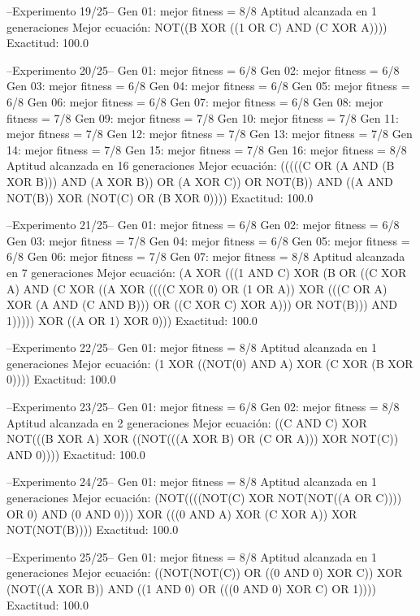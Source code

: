 --Experimento 
 19/25--
Gen 01: mejor fitness = 8/8
Aptitud alcanzada en 1 generaciones
Mejor ecuación: NOT((B XOR ((1 OR C) AND (C XOR A))))
 Exactitud: 100.0%

--Experimento 
 20/25--
Gen 01: mejor fitness = 6/8
Gen 02: mejor fitness = 6/8
Gen 03: mejor fitness = 6/8
Gen 04: mejor fitness = 6/8
Gen 05: mejor fitness = 6/8
Gen 06: mejor fitness = 6/8
Gen 07: mejor fitness = 6/8
Gen 08: mejor fitness = 7/8
Gen 09: mejor fitness = 7/8
Gen 10: mejor fitness = 7/8
Gen 11: mejor fitness = 7/8
Gen 12: mejor fitness = 7/8
Gen 13: mejor fitness = 7/8
Gen 14: mejor fitness = 7/8
Gen 15: mejor fitness = 7/8
Gen 16: mejor fitness = 8/8
Aptitud alcanzada en 16 generaciones
Mejor ecuación: (((((C OR (A AND (B XOR B))) AND (A XOR B)) OR (A XOR C)) OR NOT(B)) AND ((A AND NOT(B)) XOR (NOT(C) OR (B XOR 0))))
 Exactitud: 100.0%

--Experimento 
 21/25--
Gen 01: mejor fitness = 6/8
Gen 02: mejor fitness = 6/8
Gen 03: mejor fitness = 7/8
Gen 04: mejor fitness = 6/8
Gen 05: mejor fitness = 6/8
Gen 06: mejor fitness = 7/8
Gen 07: mejor fitness = 8/8
Aptitud alcanzada en 7 generaciones
Mejor ecuación: (A XOR (((1 AND C) XOR (B OR ((C XOR A) AND (C XOR ((A XOR ((((C XOR 0) OR (1 OR A)) XOR (((C OR A) XOR (A AND (C AND B))) OR ((C XOR C) XOR A))) OR NOT(B))) AND 1))))) XOR ((A OR 1) XOR 0)))
 Exactitud: 100.0%

--Experimento 
 22/25--
Gen 01: mejor fitness = 8/8
Aptitud alcanzada en 1 generaciones
Mejor ecuación: (1 XOR ((NOT(0) AND A) XOR (C XOR (B XOR 0))))
 Exactitud: 100.0%

--Experimento 
 23/25--
Gen 01: mejor fitness = 6/8
Gen 02: mejor fitness = 8/8
Aptitud alcanzada en 2 generaciones
Mejor ecuación: ((C AND C) XOR NOT(((B XOR A) XOR ((NOT(((A XOR B) OR (C OR A))) XOR NOT(C)) AND 0))))
 Exactitud: 100.0%

--Experimento 
 24/25--
Gen 01: mejor fitness = 8/8
Aptitud alcanzada en 1 generaciones
Mejor ecuación: (NOT((((NOT(C) XOR NOT(NOT((A OR C)))) OR 0) AND (0 AND 0))) XOR (((0 AND A) XOR (C XOR A)) XOR NOT(NOT(B))))
 Exactitud: 100.0%

--Experimento 
 25/25--
Gen 01: mejor fitness = 8/8
Aptitud alcanzada en 1 generaciones
Mejor ecuación: ((NOT(NOT(C)) OR ((0 AND 0) XOR C)) XOR (NOT((A XOR B)) AND ((1 AND 0) OR (((0 AND 0) XOR C) OR 1))))
 Exactitud: 100.0%

